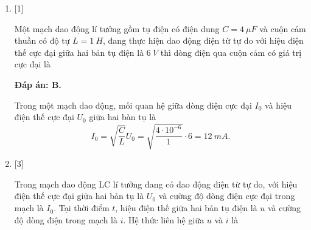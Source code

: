 \begin{enumerate}[label=\bfseries Câu \arabic*:]
{	}
	
	\item {} [1]
	
	{Một mạch dao động lí tưởng gồm tụ điện có điện dung $C = \SI{4}{\mu F}$ và cuộn cảm thuần có độ tự $L = \SI{1}{H}$, đang thực hiện dao động điện từ tự do với hiệu điện thế cực đại giữa hai bản tụ điện là $\SI{6}{V}$ thì dòng điện qua cuộn cảm có giá trị cực đại là
	}
	
	\hideall
	{		\textbf{Đáp án: B.}
		
		Trong một mạch dao động, mối quan hệ giữa dòng điện cực đại $I_{0}$ và hiệu điện thế cực đại $U_{0}$ giữa hai bàn tụ là
		$$
		I_{0}=\sqrt{\dfrac{C}{L}} U_{0}=\sqrt{\dfrac{4\cdot10^{-6}}{1}} \cdot 6=  \SI{12}{mA}.
		$$
		
		
	}
	
	
	\item {} [3]
	
	{Trong mạch dao động LC lí tưởng đang có dao động điện từ tự do, với hiệu điện thế cực đại giữa hai bản tụ là $U_0$ và cường độ dòng điện cực đại trong mạch là $I_0$. Tại thời điểm $t$, hiệu điện thế giữa hai bản tụ điện là $u$ và cường độ dòng điện trong mạch là $i$. Hệ thức liên hệ giữa $u$ và $i$ là
	}
	

\end{enumerate}
